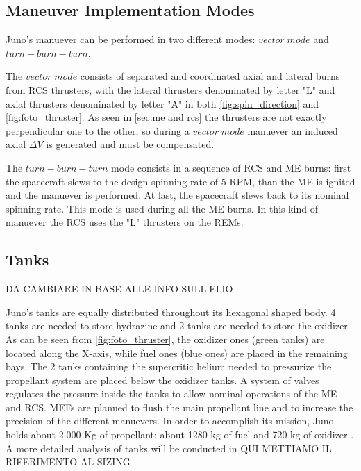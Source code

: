 \subsection{Maneuver Implementation Modes}

Juno's manuever can be performed in two different modes: $vector\;mode$ and $turn-burn-turn$.

The $vector\;mode$ consists of separated and coordinated axial and lateral burns from RCS thrusters, with the lateral thrusters denominated by letter "L" and axial thrusters denominated by letter "A" in both \autoref{fig:spin_direction} and \autoref{fig:foto_thruster}. As seen in \autoref{sec:me and rcs} the thrusters are not exactly perpendicular one to the other, so during a $vector\;mode$ manuever an induced axial $\Delta V$ is generated and must be compensated.


The $turn-burn-turn$ mode consists in a sequence of RCS and ME burns: first the spacecraft slews to the design spinning rate of 5 RPM, than the ME is ignited and the manuever is performed. At last, the spacecraft slews back to its nominal spinning rate. This mode is used during all the ME burns. In this kind of manuever the RCS uses the "L" thrusters on the REMs. 

\subsection{Tanks} DA CAMBIARE IN BASE ALLE INFO SULL'ELIO

Juno's tanks are equally distributed throughout its hexagonal shaped body. 4 tanks are needed to store hydrazine and 2 tanks are needed to store the oxidizer. As can be seen from \autoref{fig:foto_thruster}, the oxidizer ones (green tanks) are located along the X-axis, while fuel ones (blue ones) are placed in the remaining bays. The 2 tanks containing the supercritic helium needed to pressurize the propellant system are placed below the oxidizer tanks. A system of valves regulates the pressure inside the tanks to allow nominal operations of the ME and RCS. MEFs are planned to flush the main propellant line and to increase the precision of the different manuevers. 
In order to accomplish its mission, Juno holds about 2.000 Kg of propellant: about 1280 kg of fuel and 720 kg of oxidizer \cite{junno_inner}. A more detailed analysis of tanks will be conducted in QUI METTIAMO IL RIFERIMENTO AL SIZING
 











